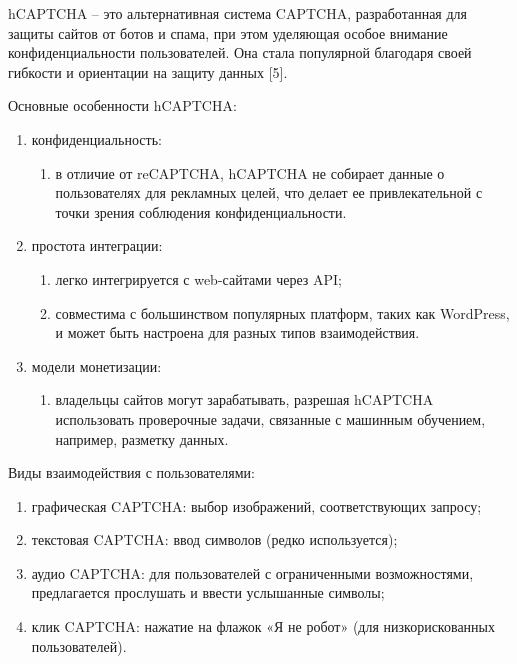 hCAPTCHA -- это альтернативная система CAPTCHA, разработанная для защиты сайтов 
от ботов и спама, при этом уделяющая особое внимание конфиденциальности 
пользователей. Она стала популярной благодаря своей гибкости и ориентации на 
защиту данных [5].  

Основные особенности hCAPTCHA:

\begin{enumerate}
    \item конфиденциальность:
    \begin{enumerate}
        \item в отличие от reCAPTCHA, hCAPTCHA не собирает данные о 
        пользователях для рекламных целей, что делает ее привлекательной с точки 
        зрения соблюдения конфиденциальности.
    \end{enumerate}
    \item простота интеграции:
    \begin{enumerate}
        \item легко интегрируется с web-сайтами через API;
        \item совместима с большинством популярных платформ, таких как WordPress, 
        и может быть настроена для разных типов взаимодействия.
    \end{enumerate}
    \item модели монетизации:
    \begin{enumerate}
        \item владельцы сайтов могут зарабатывать, разрешая hCAPTCHA 
        использовать проверочные задачи, связанные с машинным обучением, 
        например, разметку данных.
    \end{enumerate}
\end{enumerate}

Виды взаимодействия с пользователями:

\begin{enumerate}
    \item графическая CAPTCHA: выбор изображений, соответствующих запросу;
    \item текстовая CAPTCHA: ввод символов (редко используется);
    \item аудио CAPTCHA: для пользователей с ограниченными возможностями, 
    предлагается прослушать и ввести услышанные символы;
    \item клик CAPTCHA: нажатие на флажок «Я не робот» (для низкорискованных 
    пользователей).
\end{enumerate}

